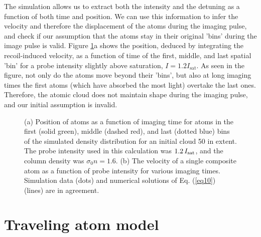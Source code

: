 The simulation allows us to extract both the intensity and the detuning as a function of both time and position. We can use this information to infer the velocity and therefore the displacement of the atoms during the imaging pulse, and check if our assumption that the atoms stay in their original 'bins' during the image pulse is valid. Figure \ref{fig:simTests}a shows the position, deduced by integrating the recoil-induced velocity, as a function of time of the first, middle, and last spatial 'bin' for a probe intensity slightly above saturation, $I = 1.2 I_{\mathrm{sat}}$. As seen in the figure, not only do the atoms move beyond their 'bins', but also at long imaging times the first atoms (which have absorbed the most light) overtake the last ones. Therefore, the atomic cloud does not maintain shape during the imaging pulse, and our initial assumption is invalid.  

\begin{figure}
\caption[Checking stationary atom assumption]{(a) Position of atoms as a function of imaging time for atoms in the first (solid green), middle (dashed red), and last (dotted blue) bins of the simulated density distribution for an initial cloud 50 \um{} in extent. The probe intensity used in this calculation was $1.2\, I_{\rm{sat}}$, and the column density was $\sigma_0 n=1.6$. (b) The velocity of a single composite atom as a function of probe intensity for various imaging times. Simulation data (dots) and numerical  solutions of Eq. (\ref{eq10}) (lines) are in agreement.}
\label{fig:simTests}
\end{figure}	

%


\section{Traveling atom model}

